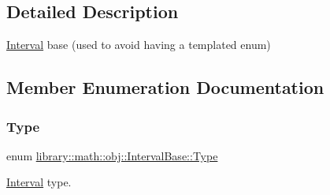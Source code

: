 \subsection{Detailed Description}
\hyperlink{classlibrary_1_1math_1_1obj_1_1_interval}{Interval} base (used to avoid having a templated enum) 

\subsection{Member Enumeration Documentation}
\mbox{\label{classlibrary_1_1math_1_1obj_1_1_interval_base_aabce6fa07a6e2e8fd3fcab5fd0d317d6}} 
\subsubsection{\texorpdfstring{Type}{Type}}
{\footnotesize\ttfamily enum \hyperlink{classlibrary_1_1math_1_1obj_1_1_interval_base_aabce6fa07a6e2e8fd3fcab5fd0d317d6}{library\+::math\+::obj\+::\+Interval\+Base\+::\+Type}\hspace{0.3cm}{\ttfamily [strong]}}



\hyperlink{classlibrary_1_1math_1_1obj_1_1_interval}{Interval} type. 

